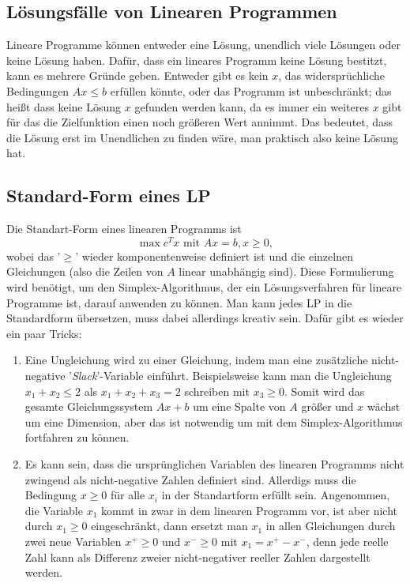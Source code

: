 \documentclass{article}
\begin{document}
\subsection{Lösungsfälle von Linearen Programmen}
Lineare Programme können entweder eine Lösung, unendlich viele Lösungen oder keine Lösung haben. Dafür, dass ein lineares Programm keine Lösung bestitzt, kann es mehrere Gründe geben. Entweder gibt es kein \(x\), das widersprüchliche Bedingungen \(Ax\leq b\) erfüllen könnte, oder das Programm ist unbeschränkt; das heißt dass keine Lösung \(x\) gefunden werden kann, da es immer ein weiteres \(x\) gibt für das die Zielfunktion einen noch größeren Wert annimmt. Das bedeutet, dass die Lösung erst im Unendlichen zu finden wäre, man praktisch also keine Lösung hat.

\subsection{Standard-Form eines LP}
Die Standart-Form eines linearen Programms ist \[
\max c^Tx \text{ mit } Ax=b, x\geq0,
\]wobei das '\(\geq\)' wieder komponentenweise definiert ist und die einzelnen Gleichungen (also die Zeilen von \(A\) linear unabhängig sind). Diese Formulierung wird benötigt, um den Simplex-Algorithmus, der ein Lösungsverfahren für lineare Programme ist, darauf anwenden zu können. Man kann jedes LP in die Standardform übersetzen, muss dabei allerdings kreativ sein. Dafür gibt es wieder ein paar Tricks:
\begin{enumerate}
    \item Eine Ungleichung wird zu einer Gleichung, indem man eine zusätzliche nicht-negative '\textit{Slack}'-Variable einführt. Beispielsweise kann man die Ungleichung \(x_1+x_2\leq2\) als \(x_1+x_2+x_3=2\) schreiben mit \(x_3\geq0\). Somit wird das gesamte Gleichungssystem \(Ax+b\) um eine Spalte von \(A\) größer und \(x\) wächst um eine Dimension, aber das ist notwendig um mit dem Simplex-Algorithmus fortfahren zu können.
    \item Es kann sein, dass die ursprünglichen Variablen des linearen Programms nicht zwingend als nicht-negative Zahlen definiert sind. Allerdigs muss die Bedingung \(x\geq0\) für alle \(x_i\) in der Standartform erfüllt sein. Angenommen, die Variable \(x_1\) kommt in zwar in dem linearen Programm vor, ist aber nicht durch \(x_1\geq0\) eingeschränkt, dann ersetzt man \(x_1\) in allen Gleichungen durch zwei neue Variablen \(x^+\geq0\) und \(x^-\geq0\) mit \(x_1=x^+-x^-\), denn jede reelle Zahl kann als Differenz zweier nicht-negativer reeller Zahlen dargestellt werden.
\end{enumerate}
\end{document}
